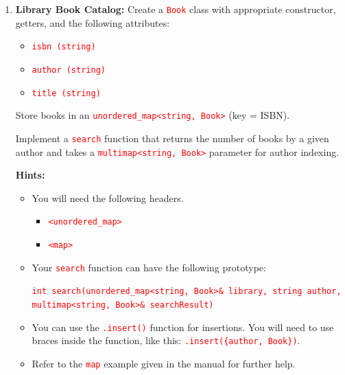\documentclass[12pt]{article}
\begin{document}
\begin{enumerate}

    \item \textbf{Library Book Catalog:} Create a \textcolor{red}{\texttt{Book}} class with appropriate constructor, getters, and the following attributes:

    \begin{itemize}
        \item \textcolor{red}{\texttt{isbn (string)}}
        \item \textcolor{red}{\texttt{author (string)}}
        \item \textcolor{red}{\texttt{title (string)}}
    \end{itemize}

    Store books in an \textcolor{red}{\texttt{unordered\_map<string, Book>}} (key = ISBN).

    Implement a \textcolor{red}{\texttt{search}} function that returns the number of books by a given author and takes a \textcolor{red}{\texttt{multimap<string, Book>}} parameter for 
    author indexing.

    \textbf{Hints:}

    \begin{itemize}
        \item You will need the following headers.
        
        \begin{itemize}
            \item \textcolor{red}{\texttt{<unordered\_map>}}
            \item \textcolor{red}{\texttt{<map>}}
        \end{itemize}

        \item Your \textcolor{red}{\texttt{search}} function can have the following prototype: 
        
        \textcolor{red}{\texttt{int search(unordered\_map<string, Book>\& library, string author, multimap<string, Book>\& searchResult)}}

        \item You can use the \textcolor{red}{\texttt{.insert()}} function for insertions. You will need to use braces inside the function, like this: 
        \textcolor{red}{\texttt{.insert(\{author, Book\})}}.

        \item Refer to the \textcolor{red}{\texttt{map}} example given in the manual for further help.
        

\end{itemize}
\end{enumerate}
\end{document}

